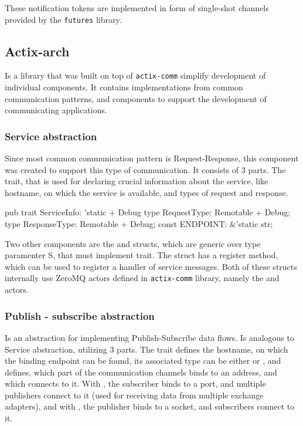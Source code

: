 These notification tokens are implemented in form of single-shot channels provided by the \verb|futures| library.

\subsection{Actix-arch}
Is a library that was built on top of \verb|actix-comm| simplify development of individual components. It contains implementations
from common communication patterns, and components to support the development of communicating applications.

\subsubsection{Service abstraction}
Since most common communication pattern is Request-Response, this component was created to support this type of communication.
It consists of 3 parts. The  trait, that is used for declaring crucial information about the service, like
hostname, on which the service is available, and types of request and response.

\begin{code}[language=rust,label={svcinfo_trait},caption={ServiceInfo trait definition}]
pub trait ServiceInfo: 'static + Debug {
    type RequestType: Remotable + Debug;
    type ResponseType: Remotable + Debug;
    const ENDPOINT: &'static str;
}
\end{code}

Two other components are the  and  structs, which are generic over type paramenter
S, that must implement  trait. The  struct has a register method, which can be used to register a handler of service messages.
Both of these structs internally use ZeroMQ actors defined in \verb|actix-comm| library, namely the  and  actors.

\subsubsection{Publish - subscribe abstraction}
Is an abstraction for implementing Publish-Subscribe data flows.
Is analogous to Service abstraction, utilizing 3 parts. The  trait defines the hostname, on which
the binding endpoint can be found, its associated type  can be either  or ,
and defines, which part of the communication channels binds to an address, and which connects to it.
With , the subscriber binds to a port, and multiple publishers connect to it (used for receiving data from multiple exchange adapters),
and with , the publisher binds to a socket, and subscribers connect to it.

